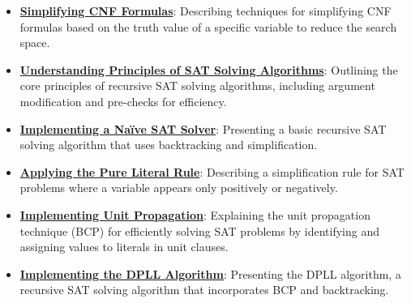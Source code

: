 \documentclass{article}%
\begin{document}
\begin{itemize}[leftmargin=*]
\item \href{https://purdue.brightspace.com/d2l/common/assets/pdfjs-d2l-dist/1.0.14-legacy/web/viewer.html?file=%2Fcontent%2Fenforced%2F1095467-wl.202510.CS.24300.001%2F15L2-SAT.pdf%3Fou%3D1095467&lang=en-us&container=d2l-fileviewer-rendered-pdf&fullscreen=d2l-fileviewer-rendered-pdf-dialog&height=667#page=15}{\textbf{Simplifying CNF Formulas}}: Describing techniques for simplifying CNF formulas based on the truth value of a specific variable to reduce the search space.%
\item \href{https://purdue.brightspace.com/d2l/common/assets/pdfjs-d2l-dist/1.0.14-legacy/web/viewer.html?file=%2Fcontent%2Fenforced%2F1095467-wl.202510.CS.24300.001%2F15L2-SAT.pdf%3Fou%3D1095467&lang=en-us&container=d2l-fileviewer-rendered-pdf&fullscreen=d2l-fileviewer-rendered-pdf-dialog&height=667#page=17}{\textbf{Understanding Principles of SAT Solving Algorithms}}: Outlining the core principles of recursive SAT solving algorithms, including argument modification and pre-checks for efficiency.%
\item \href{https://purdue.brightspace.com/d2l/common/assets/pdfjs-d2l-dist/1.0.14-legacy/web/viewer.html?file=%2Fcontent%2Fenforced%2F1095467-wl.202510.CS.24300.001%2F15L2-SAT.pdf%3Fou%3D1095467&lang=en-us&container=d2l-fileviewer-rendered-pdf&fullscreen=d2l-fileviewer-rendered-pdf-dialog&height=667#page=18}{\textbf{Implementing a Naïve SAT Solver}}: Presenting a basic recursive SAT solving algorithm that uses backtracking and simplification.%
\item \href{https://purdue.brightspace.com/d2l/common/assets/pdfjs-d2l-dist/1.0.14-legacy/web/viewer.html?file=%2Fcontent%2Fenforced%2F1095467-wl.202510.CS.24300.001%2F15L2-SAT.pdf%3Fou%3D1095467&lang=en-us&container=d2l-fileviewer-rendered-pdf&fullscreen=d2l-fileviewer-rendered-pdf-dialog&height=667#page=19}{\textbf{Applying the Pure Literal Rule}}: Describing a simplification rule for SAT problems where a variable appears only positively or negatively.%
\item \href{https://purdue.brightspace.com/d2l/common/assets/pdfjs-d2l-dist/1.0.14-legacy/web/viewer.html?file=%2Fcontent%2Fenforced%2F1095467-wl.202510.CS.24300.001%2F15L2-SAT.pdf%3Fou%3D1095467&lang=en-us&container=d2l-fileviewer-rendered-pdf&fullscreen=d2l-fileviewer-rendered-pdf-dialog&height=667#page=20}{\textbf{Implementing Unit Propagation}}: Explaining the unit propagation technique (BCP) for efficiently solving SAT problems by identifying and assigning values to literals in unit clauses.%
\item \href{https://purdue.brightspace.com/d2l/common/assets/pdfjs-d2l-dist/1.0.14-legacy/web/viewer.html?file=%2Fcontent%2Fenforced%2F1095467-wl.202510.CS.24300.001%2F15L2-SAT.pdf%3Fou%3D1095467&lang=en-us&container=d2l-fileviewer-rendered-pdf&fullscreen=d2l-fileviewer-rendered-pdf-dialog&height=667#page=21}{\textbf{Implementing the DPLL Algorithm}}: Presenting the DPLL algorithm, a recursive SAT solving algorithm that incorporates BCP and backtracking.%

\end{itemize}
\end{document}
